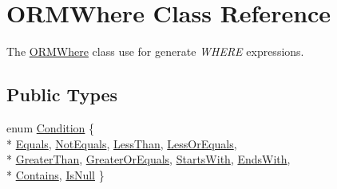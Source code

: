 \hypertarget{class_o_r_m_where}{\section{O\-R\-M\-Where Class Reference}
\label{class_o_r_m_where}
}


The \hyperlink{class_o_r_m_where}{O\-R\-M\-Where} class use for generate {\itshape W\-H\-E\-R\-E} expressions.  


\subsection*{Public Types}
\begin{DoxyCompactItemize}
\item 
enum \hyperlink{class_o_r_m_where_a187706d50dd5a95bdbffc6e41f617275}{Condition} \{ \\*
\hyperlink{class_o_r_m_where_a187706d50dd5a95bdbffc6e41f617275ae39fef7ec26a030eb0346ce6ab33e504}{Equals}, 
\hyperlink{class_o_r_m_where_a187706d50dd5a95bdbffc6e41f617275a99524b7bbffa3a9ad1705478fe500e10}{Not\-Equals}, 
\hyperlink{class_o_r_m_where_a187706d50dd5a95bdbffc6e41f617275a96b3a54ad253eb733f38c1944afeb497}{Less\-Than}, 
\hyperlink{class_o_r_m_where_a187706d50dd5a95bdbffc6e41f617275a0da83e257da652ff0b20dfb44ff479cc}{Less\-Or\-Equals}, 
\\*
\hyperlink{class_o_r_m_where_a187706d50dd5a95bdbffc6e41f617275a7661e0158bc3ea708dbda5ff1a475770}{Greater\-Than}, 
\hyperlink{class_o_r_m_where_a187706d50dd5a95bdbffc6e41f617275adcb94b4ea868b22f4b800d556a791a6a}{Greater\-Or\-Equals}, 
\hyperlink{class_o_r_m_where_a187706d50dd5a95bdbffc6e41f617275acd9c4b493076159ffded1e2724c7c67a}{Starts\-With}, 
\hyperlink{class_o_r_m_where_a187706d50dd5a95bdbffc6e41f617275a3e3b42e843f28aa5a6de2d703de4f963}{Ends\-With}, 
\\*
\hyperlink{class_o_r_m_where_a187706d50dd5a95bdbffc6e41f617275a19eb46ac2efeb7fc5f45559b473abf0f}{Contains}, 
\hyperlink{class_o_r_m_where_a187706d50dd5a95bdbffc6e41f617275a7ca65a0edfd9b9a2d12a391b6f1eeccb}{Is\-Null}
 \}
\end{DoxyCompactItemize}
